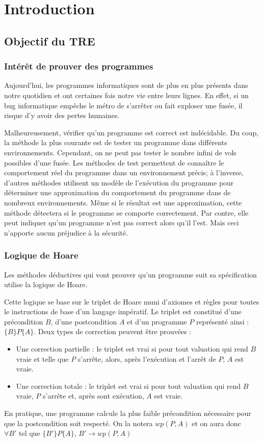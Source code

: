 \documentclass[9pt]{book}
\begin{document}
\chapter{Introduction}
	\section{Objectif du TRE}
		\subsection{Int\'er\^et de prouver des programmes}
		Aujourd'hui, les programmes informatiques sont de plus en plus pr\'esents dans notre quotidien et ont certaines fois notre vie entre leurs lignes. En effet, si un bug informatique emp\^eche le m\'etro de s'arr\^eter ou fait exploser une fus\'ee, il risque d'y avoir des pertes humaines. \par
		Malheureusement, v\'erifier qu'un programme est correct est ind\'ecidable. Du coup, la m\'ethode la plus courante est de tester un programme dans diff\'erents environnements. Cependant, on ne peut pas tester le nombre infini de vols possibles d'une fus\'ee. Les m\'ethodes de test permettent de conna\^itre le comportement r\'eel du programme dans un environnement pr\'ecis; \`a l'inverse, d'autres m\'ethodes utilisent un mod\`ele de l'ex\'ecution du programme pour d\'eterminer une approximation du comportement du programme dans de nombreux environnements. M\^eme si le r\'esultat est une approximation, cette m\'ethode d\'etectera si le programme se comporte correctement. Par contre, elle peut indiquer qu'un programme n'est pas correct alors qu'il l'est. Mais ceci n'apporte aucun pr\'ejudice \`a la s\'ecurit\'e.

		\subsection{Logique de Hoare}
		Les m\'ethodes d\'eductives qui vont prouver qu'un programme suit sa sp\'ecification utilise la logique de Hoare.\par
		Cette logique se base sur le triplet de Hoare muni d'axiomes et r\`egles pour toutes le instructions de base d'un langage imp\'eratif. Le triplet est constitu\'e d'une pr\'econdition $B$, d'une postcondition $A$ et d'un programme $P$ repr\'esent\'e ainsi : $\{B\}P\{A\}$. Deux types de correction peuvent \^etre prouv\'ees :
		\begin{itemize}
			\item Une correction partielle : le triplet est vrai si pour tout valuation qui rend $B$ vraie et telle que $P$ s'arr\^ete, alors, apr\`es l'ex\'ecution et l'arr\^et de $P$, $A$ est vraie.
			\item Une correction totale : le triplet est vrai si pour tout valuation qui rend $B$ vraie, $P$ s'arr\^ete et, apr\`es sont ex\'ecution, $A$ est vraie.
		\end{itemize}
		En pratique, une programme calcule la plus faible pr\'econdition n\'ecessaire pour que la postcondition soit respect\'e. On la notera $wp(P,A)$ et on aura donc\\ $\forall B'$ tel que $\{B'\}P\{A\}$, $B' \rightarrow wp(P,A)$
\end{document}
